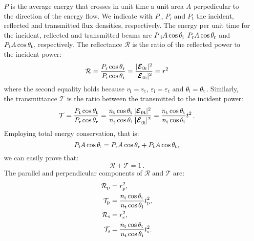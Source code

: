 $P$ is the average energy that crosses in unit time a unit area $A$ perpedicular to the direction of the energy flow.
We indicate with $P_{\textrm{i}}$, $P_{\textrm{r}}$ and $P_{\textrm{t}}$ the incident, reflected and transmitted flux densities, respectively.
The energy per unit time for the incident, reflected and transmitted beams are 
$P_\textrm{
i} A\cos\theta_\textrm{i}$ $P_\textrm{r} A\cos\theta_\textrm{r}$ and 
$P_\textrm{t} A\cos\theta_\textrm{t}$, respectively. %
The reflectance $\mathcal{R}$ is the ratio of the reflected power to the incident power:
\begin{equation}\label{reflectance}
\mathcal{R} = \frac{P_\textrm{r}\cos\theta_\textrm{r}}{P_\textrm{i}\cos\theta_\textrm{i}} = \frac{|\boldsymbol{\mathcal{E}}_{0 \textrm{r}}|^2}{|\boldsymbol{\mathcal{E}}_{0 \textrm{i}}|^2} = r^2
\end{equation}
where the second equality holds because $v_{\textrm{i}}= v_{\textrm{t}}$, $\varepsilon_{\textrm{i}} = \varepsilon_{\textrm{t}}$ and $\theta_{\textrm{i}} = \theta_{\textrm{t}}$.
Similarly, the transmittance $\mathcal{T}$ is the ratio between the transmitted to the incident power:
\begin{equation}\label{transmittance}
\mathcal{T} = \frac{P_\textrm{t} \cos\theta_\textrm{t}}{P_\textrm{r}\cos\theta_\textrm{r}} = \frac{n_\textrm{t} \cos\theta_\textrm{t}}{n_\textrm{t} \cos\theta_\textrm{i}}\frac{|\boldsymbol{\mathcal{E}}_{0 \textrm{t}}|^2}{\boldsymbol{|\mathcal{E}}_{0 \textrm{i}}|^2} = \frac{n_\textrm{t} \cos\theta_\textrm{t}}{n_\textrm{t} \cos\theta_\textrm{i}} t^2\,.
\end{equation}
Employing total energy conservation, that is:
\begin{equation}
P_\textrm{i} A\cos\theta_\textrm{i} = P_\textrm{r} A\cos\theta_\textrm{r}+P_\textrm{t} A\cos\theta_\textrm{t},
\end{equation}
we can easily prove that:
\begin{equation}
\mathcal{R}+\mathcal{T}=1\,.
\end{equation}
 The parallel and perpendicular components of $\mathcal{R}$ and $\mathcal{T}$ are:
\begin{equation}\label{Fresnel_pands}
\begin{split}
\mathcal{R}_\textrm{p}& =  {r_\textrm{p}^2},\\
\mathcal{T}_\textrm{p} &=  \frac{n_\textrm{t} \cos\theta_\textrm{t}}{n_\textrm{t} \cos\theta_\textrm{i}}t_\textrm{p}^2,\\
\mathcal{R}_\textrm{s} &=  r_\textrm{s}^2,\\
\mathcal{T}_\textrm{s} &= \frac{n_\textrm{t} \cos\theta_\textrm{t}}{n_\textrm{t} \cos\theta_\textrm{i}}t_\textrm{s}^2.\\
\end{split}
\end{equation}
